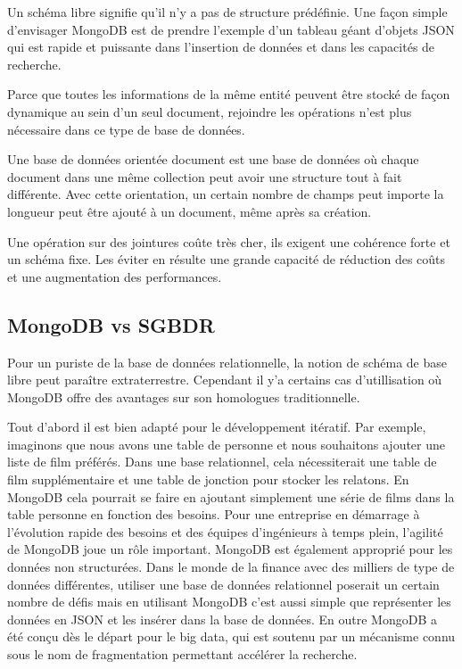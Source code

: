 Un schéma libre signifie qu'il n'y a pas de structure prédéfinie. Une façon simple d’envisager MongoDB est de prendre l’exemple d’un tableau géant d’objets JSON qui est rapide et puissante dans l’insertion de données et dans les capacités de recherche.

Parce que toutes les informations de la même entité peuvent être stocké de façon dynamique au sein d’un seul document, rejoindre les opérations n’est plus nécessaire dans ce type de base de données.

Une base de données orientée document est une base de données où chaque document dans une même collection peut avoir une structure tout à fait différente. Avec cette orientation, un certain nombre de champs peut importe la longueur peut être ajouté à un document, même après sa création.

Une opération sur des jointures coûte très cher, ils exigent une cohérence forte et un schéma fixe. Les éviter en résulte une grande capacité de réduction des coûts et une augmentation des performances. 

\subsection{MongoDB vs SGBDR}

Pour un puriste de la base de données relationnelle, la notion de schéma de base libre peut paraître extraterrestre. Cependant il y’a certains cas d’utillisation où MongoDB  offre des avantages sur son homologues traditionnelle. 

Tout d’abord il est bien adapté pour le développement itératif. Par exemple, imaginons que nous avons une table de personne et nous souhaitons ajouter une liste de film préférés. Dans une base relationnel, cela nécessiterait une table de film supplémentaire et une table de jonction pour stocker les relatons. En MongoDB cela pourrait se faire en ajoutant simplement une série de films dans la table personne en fonction des besoins. Pour une entreprise en démarrage à l’évolution rapide des besoins et des équipes d'ingénieurs à temps plein, l’agilité de MongoDB joue un rôle important.
MongoDB est également approprié pour les données non structurées. Dans le monde de la finance avec des milliers de type de données différentes, utiliser une base de données relationnel poserait un certain nombre de défis mais en utilisant MongoDB c’est aussi simple que représenter les données en JSON et les insérer dans la base de données.
En outre MongoDB a été conçu dès le départ pour le big data, qui est soutenu par un mécanisme connu sous le nom de fragmentation permettant accélérer la recherche.


